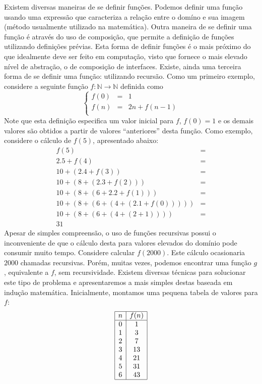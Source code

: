 Existem diversas maneiras de se definir funções. Podemos definir uma
função usando uma expressão que caracteriza a relação entre o domíno e
sua imagem (método usualmente utilizado na matemática). Outra maneira
de se definir uma função é através do uso de composição, que permite a
definição de funções utilizando definições prévias. Esta forma de
definir funções é o mais próximo do que idealmente deve ser feito em
computação, visto que fornece o mais elevado nível de abstração,  o
de composição de interfaces. Existe, ainda uma terceira forma de se definir uma função:
utilizando recursão. Como um primeiro exemplo,
considere a seguinte função $f : \mathbb{N} \to \mathbb{N}$ definida
como
\[
\left\{
\begin{array}{lcl}
  f(0) & = & 1 \\
  f(n) & = & 2n + f(n - 1)\\
\end{array}
\right .
\]
Note que esta definição especifica um valor inicial para $f$, $f(0) =
1$ e os demais valores são obtidos a partir de valores ``anteriores''
desta função. Como exemplo, considere o cálculo de $f(5)$, apresentado
abaixo:
\[
\begin{array}{lc}
f(5) & = \\
2.5 + f(4) & = \\
10 + (2.4 + f(3)) & = \\
10 + (8 + (2.3 + f(2))) & = \\
 10 + (8 + (6 + 2.2 + f(1))) & = \\
10 + (8 + (6 + (4 + (2.1 + f(0))))) & = \\
10 + (8 + (6 + (4 + (2 + 1)))) & = \\
31
\end{array}
\]
Apesar de simples compreensão, o uso de funções recursivas possui o
inconveniente de que o cálculo desta para valores elevados do domínio
pode consumir muito tempo. Considere calcular $f(2000)$. Este cálculo
ocasionaria $2000$ chamadas recursivas. Porém, muitas vezes, podemos
encontrar uma função $g$, equivalente a $f$, sem
recursividade. Existem diversas técnicas para solucionar este tipo de
problema e apresentaremos a mais simples destas baseada em indução matemática.
Inicialmente, montamos uma pequena tabela de valores para $f$:
\[
\begin{array}{|c|c|}
  \hline
  n & f(n) \\ \hline
  0 &  1 \\
  1 &  3 \\
  2 &  7 \\
  3 & 13 \\
  4 & 21 \\
  5 & 31 \\
  6 & 43 \\ \hline
\end{array}
\]
